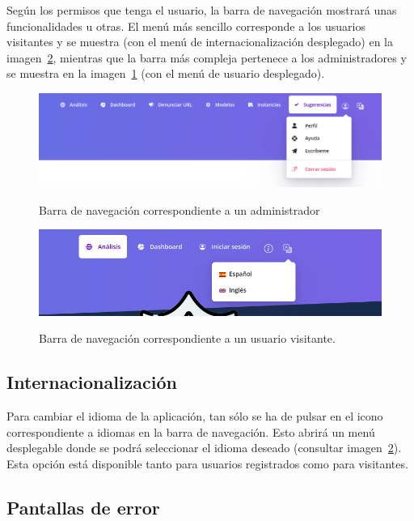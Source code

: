 Según los permisos que tenga el usuario, la barra de navegación mostrará unas funcionalidades u otras. El menú más sencillo corresponde a los usuarios visitantes y se muestra (con el menú de internacionalización desplegado) en la imagen~\ref{e-9:navbar-2}, mientras que la barra más compleja pertenece a los administradores y se muestra en la imagen~\ref{e-9:navbar} (con el menú de usuario desplegado).
\begin{figure}[h]
	\caption[Manual de usuario: barra navegación (usuario iniciado)]{Barra de navegación correspondiente a un administrador}
	\centering
	\includegraphics[width=\textwidth]{../img/anexos/user_guide/9_navbar_init}
	\label{e-9:navbar}
\end{figure}

\begin{figure}[h]
	\caption[Manual de usuario: barra navegación (visitante)]{Barra de navegación correspondiente a un usuario visitante.}
	\centering
	\includegraphics[width=\textwidth]{../img/anexos/user_guide/9_navbar_no_init}
	\label{e-9:navbar-2}
\end{figure}


\subsection{Internacionalización}

Para cambiar el idioma de la aplicación, tan sólo se ha de pulsar en el icono correspondiente a idiomas en la barra de navegación. Esto abrirá un menú desplegable donde se podrá seleccionar el idioma deseado (consultar imagen~\ref{e-9:navbar-2}). Esta opción está disponible tanto para usuarios registrados como para visitantes.


\subsection{Pantallas de error}


